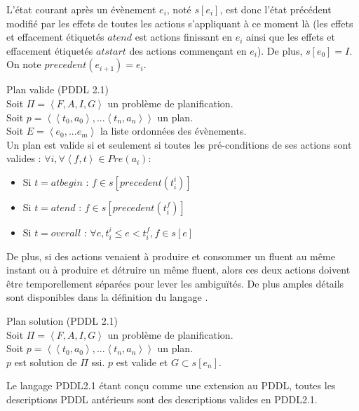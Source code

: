 L'état courant après un évènement $e_i$, noté $s[e_i]$, est donc l'état précédent modifié par les effets de toutes les actions s'appliquant à ce moment là (les effets et effacement étiquetés $atend$ est actions finissant en $e_i$ ainsi que les effets et effacement étiquetés $atstart$ des actions commençant en $e_i$).
De plus, $s[e_0] = I$.
On note $precedent(e_{i+1}) = e_i$.

\begin{definition}Plan valide (PDDL 2.1)\\
	Soit $\Pi = \left<F,A,I,G\right>$ un problème de planification. \\
	Soit $p = \left< \left< t_0, a_0 \right>, ... \left< t_n, a_n \right> \right>$ un plan.\\
	Soit $E = \left< e_0, ... e_m\right>$ la liste ordonnées des évènements.\\
	Un plan est valide si et seulement si toutes les pré-conditions de ses actions sont valides :
	$\forall i, \forall \left< f, t \right> \in Pre(a_i) :$
	\begin{itemize}
		\item Si $t = atbegin$ : $f \in s[precedent(t^i_i)]$
		\item Si $t = atend$ : $f \in s[precedent(t^f_i)]$
		\item Si $t = overall$ : $\forall e, t^i_i \leq e < t^f_i, f \in s[e]$
	\end{itemize} 
\end{definition}

De plus, si des actions venaient à produire et consommer un fluent au même instant ou à produire et détruire un même fluent, alors ces deux actions doivent être temporellement séparées pour lever les ambiguïtés.
De plus amples détails sont disponibles dans la définition du langage \cite{Fox2003}.

\begin{definition}Plan solution (PDDL 2.1)\\
	Soit $\Pi = \left<F,A,I,G\right>$ un problème de planification. \\
	Soit $p = \left< \left< t_0, a_0 \right>, ... \left< t_n, a_n \right> \right>$ un plan.\\
	$p$ est solution de $\Pi$ ssi. $p$ est valide et $G \subset s[e_n]$. 
\end{definition}

Le langage PDDL2.1 étant conçu comme une extension au PDDL, toutes les descriptions PDDL antérieurs sont des descriptions valides en PDDL2.1.

